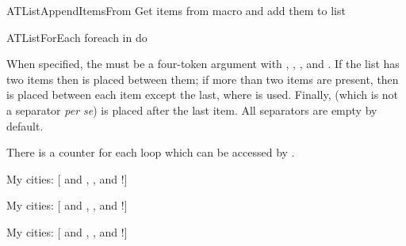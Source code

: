 \documentclass[a4paper, 11pt]{article}
\begin{document}

\begin{Macrodef}{ATListAppendItemsFrom}{}{}
    Get items from macro and add them to list
\end{Macrodef}

\begin{Macrodef}{ATListForEach}{}{}
    foreach  in  do 

    When specified, the  must be a four-token argument with , , , and . If the list has two items then  is placed between them; if more than two items are present, then  is placed between each item except the last, where  is used. Finally,  (which is not a separator \textit{per se}) is placed after the last item. All separators are empty by default.

    There is a counter for each loop which can be accessed by .
\end{Macrodef}

\begin{PDExample}
    \def\MyCities{Paris, London, Rio de Janeiro}
\end{PDExample}

\begin{PDExample}
    My cities: [{ and }{, }{, and }{!}]{\textit{\city}}

    My cities: [{ and }{, }{, and }{!}]{\textit{\city}}

    My cities: [{ and }{, }{, and }{!}]{\textit{\city}}
\end{PDExample}
\end{document}
